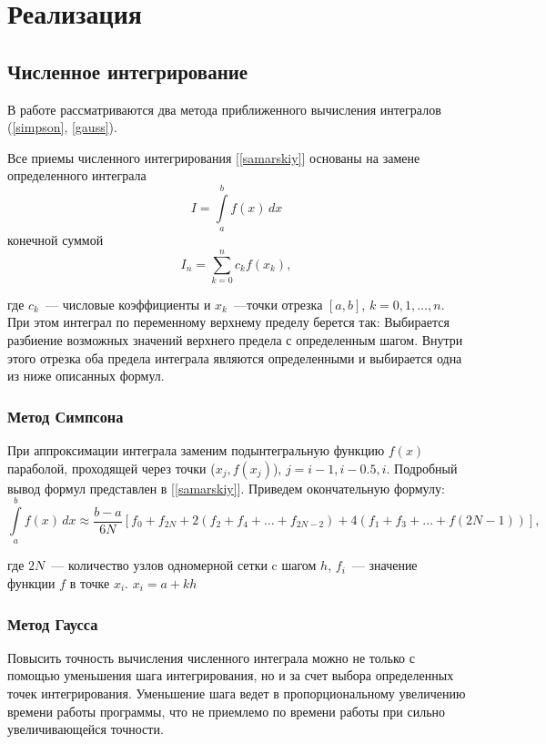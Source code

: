 \chapter{Реализация}
\section{Численное интегрирование}
В работе рассматриваются два метода приближенного вычисления интегралов
(\ref{simpson}, \ref{gauss}).

Все приемы численного интегрирования [\ref{samarskiy}] основаны на  замене определенного интеграла 
\begin{equation}
	I = \int\limits_a^b f(x)\,dx
\end{equation}
конечной суммой
\begin{equation}
	I_n = \sum\limits_{k=0}^n c_k f(x_k),
\end{equation}

где $c_k$~--- числовые коэффициенты и $x_k$~---точки отрезка $[a,b]$, $k=0, 1, \ldots, n$.
При этом интеграл по переменному верхнему пределу берется так: Выбирается разбиение возможных значений верхнего предела
с определенным шагом. Внутри этого отрезка оба предела интеграла являются определенными и выбирается одна из ниже описанных формул.

\subsection{Метод Симпсона\label{simpson}}
При аппроксимации интеграла заменим подынтегральную функцию $f(x)$ параболой, проходящей через точки
($x_j, f(x_j) $), $j=i-1, i-0.5, i$. Подробный вывод формул представлен в [\ref{samarskiy}]. Приведем окончательную формулу:
\begin{equation}
\int\limits^b_a f(x)\,dx \approx \dfrac{b-a}{6N}\left[f_0 +f_{2N}+2(f_2+f_4+\ldots+f_{2N-2})+4(f_1+f_3+\ldots+f(2N-1))\right],
\end{equation}

где $2N$~--- количество узлов одномерной сетки c шагом $h$, $f_i$~--- значение функции $f$ в точке $x_i$. $x_i = a+kh$

\subsection{Метод Гаусса\label{gauss}}
Повысить точность вычисления численного интеграла можно не только с помощью уменьшения шага интегрирования, но и за счет 
выбора определенных точек интегрирования. Уменьшение шага ведет в пропорциональному увеличению времени работы программы, что не
приемлемо по времени работы при сильно увеличивающейся точности.

